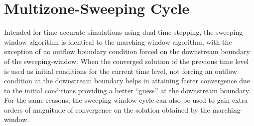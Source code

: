 \documentclass{warpdoc}
\begin{document}
\section{Multizone-Sweeping Cycle}

Intended for time-accurate simulations using dual-time stepping,
the sweeping-window algorithm \cite{jcp:2002:parent} is identical to the marching-window
algorithm, with the exception of no outflow boundary condition forced on the downstream
boundary of the sweeping-window. When the converged solution of the previous
time level is used as initial conditions for the current time level, not forcing
an outflow condition at the downstream boundary helps in attaining faster
convergence due to the initial conditions providing a better ``guess'' at the downstream boundary.
For the same reasons, the sweeping-window cycle can also be used to gain extra
orders of magnitude of convergence on the solution obtained by the marching-window.


  
  
\end{document}
